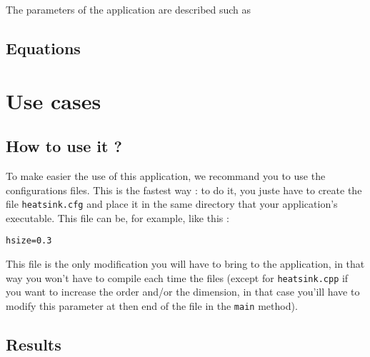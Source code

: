 The parameters of the application are described such as 
%

\subsection{Equations}
\label{heat:eq_impl}

\section{Use cases}
\subsection{How to use it ?}
To make easier the use of this application, we recommand you to use the configurations files. This is the fastest way : to do it, you juste have to create the file \lstinline!heatsink.cfg! and place it in the same directory that your application's executable. This file can be, for example, like this :
\begin{lstlisting}
hsize=0.3
\end{lstlisting}
This file is the only modification you will have to bring to the application, in that way you won't have to compile each time the files (except for \lstinline!heatsink.cpp! if you want to increase the order and/or the dimension, in that case you'ill have to modify this parameter at then end of the file in the \lstinline!main! method).

\subsection{Results}
